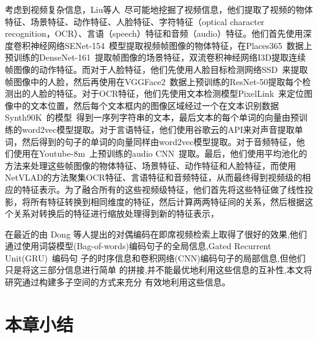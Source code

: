 考虑到视频复杂信息，Liu等人~\cite{liu2019use}尽可能地挖掘了视频信息，他们提取了视频的物体特征、场景特征、动作特征、人脸特征、字符特征（optical character recognition，OCR）、言语（speech）特征和音频（audio）特征。他们首先使用深度卷积神经网络SENet-154~\cite{}模型提取视频帧图像的物体特征，在Places365~\cite{}数据上预训练的DenseNet-161~\cite{}提取帧图像的场景特征，双流卷积神经网络I3D提取连续帧图像的动作特征。而对于人脸特征，他们先使用人脸目标检测网络SSD~\cite{}来提取帧图像中的人脸，然后再使用在VGGFace2~\cite{}数据上预训练的ResNet-50提取每个检测出的人脸的特征。对于OCR特征，他们先使用文本检测模型PixelLink~\cite{}来定位图像中的文本位置，然后每个文本框内的图像区域经过一个在文本识别数据Synth90K~\cite{}的模型~\cite{}得到一序列字符串的文本，最后文本的每个单词的向量由预训练的word2vec模型提取。对于言语特征，他们使用谷歌云的API来对声音提取单词，然后得到的句子的单词的向量同样由word2vec模型提取。对于音频特征，他们使用在Youtube-8m~\cite{}上预训练的audio CNN~\cite{}提取。最后，他们使用平均池化的方法来处理这些帧图像的物体特征、场景特征、动作特征和人脸特征，而使用NetVLAD的方法聚集OCR特征、言语特征和音频特征，从而最终得到视频级的相应的特征表示。为了融合所有的这些视频级特征，他们首先将这些特征做了线性投影，将所有特征转换到相同维度的特征，然后计算两两特征间的关系，然后根据这个关系对转换后的特征进行缩放处理得到新的特征表示，


在最近的由 Dong 等人\cite{dong2019dual}提出的对偶编码在即席视频检索上取得了很好的效果,他们
通过使用词袋模型(Bag-of-words)编码句子的全局信息,Gated Recurrent Unit(GRU)~\cite{cho2014learning}编码句
子的时序信息和卷积网络(CNN)编码句子的局部信息,但他们只是将这三部分信息进行简单
的拼接,并不能最优地利用这些信息的互补性,本文将研究通过构建多子空间的方式来充分
有效地利用这些信息。


\section{本章小结}
